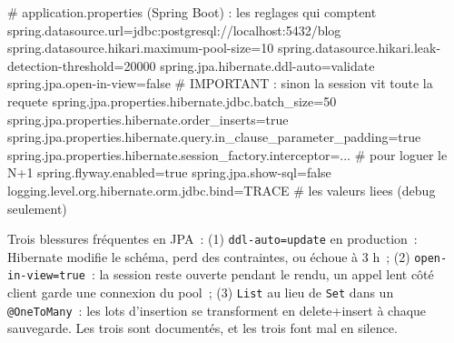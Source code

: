 \documentclass[12pt,a4paper,twoside,openright]{book}
\begin{document}

\begin{codeconf}
# application.properties (Spring Boot) : les reglages qui comptent
spring.datasource.url=jdbc:postgresql://localhost:5432/blog
spring.datasource.hikari.maximum-pool-size=10
spring.datasource.hikari.leak-detection-threshold=20000
spring.jpa.hibernate.ddl-auto=validate
spring.jpa.open-in-view=false                       # IMPORTANT : sinon la session vit toute la requete
spring.jpa.properties.hibernate.jdbc.batch_size=50
spring.jpa.properties.hibernate.order_inserts=true
spring.jpa.properties.hibernate.query.in_clause_parameter_padding=true
spring.jpa.properties.hibernate.session_factory.interceptor=...   # pour loguer le N+1
spring.flyway.enabled=true
spring.jpa.show-sql=false
logging.level.org.hibernate.orm.jdbc.bind=TRACE      # les valeurs liees (debug seulement)
\end{codeconf}

\begin{piege}
Trois blessures fr\'equentes en JPA~: (1) \verb|ddl-auto=update| en production~: Hibernate modifie le
sch\'ema, perd des contraintes, ou \'echoue \`a 3 h~; (2) \verb|open-in-view=true|~: la session reste
ouverte pendant le rendu, un appel lent c\^ot\'e client garde une connexion du pool~; (3) \verb|List| au
lieu de \verb|Set| dans un \verb|@OneToMany|~: les lots d'insertion se transforment en delete+insert
\`a chaque sauvegarde. Les trois sont document\'es, et les trois font mal en silence.
\end{piege}
\end{document}
